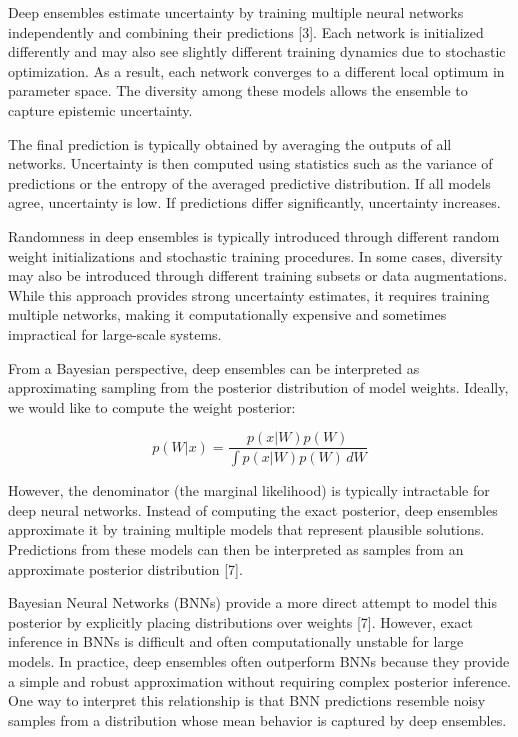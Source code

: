 \documentclass{article}
\renewcommand{\cite}[1]{[#1]}
\begin{document}
Deep ensembles estimate uncertainty by training multiple neural networks independently and combining their predictions \cite{3}. Each network is initialized differently and may also see slightly different training dynamics due to stochastic optimization. As a result, each network converges to a different local optimum in parameter space. The diversity among these models allows the ensemble to capture epistemic uncertainty.

The final prediction is typically obtained by averaging the outputs of all networks. Uncertainty is then computed using statistics such as the variance of predictions or the entropy of the averaged predictive distribution. If all models agree, uncertainty is low. If predictions differ significantly, uncertainty increases.

Randomness in deep ensembles is typically introduced through different random weight initializations and stochastic training procedures. In some cases, diversity may also be introduced through different training subsets or data augmentations. While this approach provides strong uncertainty estimates, it requires training multiple networks, making it computationally expensive and sometimes impractical for large-scale systems.

From a Bayesian perspective, deep ensembles can be interpreted as approximating sampling from the posterior distribution of model weights. Ideally, we would like to compute the weight posterior:

\[
p(W|x) = \frac{p(x|W)p(W)}{\int p(x|W)p(W)\, dW}
\]

However, the denominator (the marginal likelihood) is typically intractable for deep neural networks. Instead of computing the exact posterior, deep ensembles approximate it by training multiple models that represent plausible solutions. Predictions from these models can then be interpreted as samples from an approximate posterior distribution \cite{7}.

Bayesian Neural Networks (BNNs) provide a more direct attempt to model this posterior by explicitly placing distributions over weights \cite{7}. However, exact inference in BNNs is difficult and often computationally unstable for large models. In practice, deep ensembles often outperform BNNs because they provide a simple and robust approximation without requiring complex posterior inference. One way to interpret this relationship is that BNN predictions resemble noisy samples from a distribution whose mean behavior is captured by deep ensembles.
\end{document}
